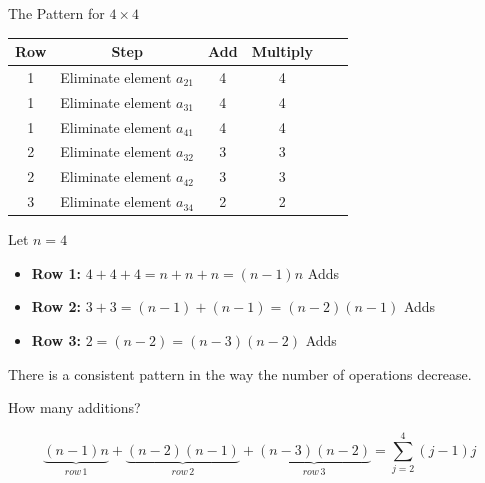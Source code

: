 \documentclass[10pt]{beamer}
\begin{document}
\begin{frame}{The Pattern for $4\times4$}
    \begin{center}
\begin{tabular}{c c c c c c}\hline
 Row & Step & Add & Multiply  \\\hline
 1 &  Eliminate element $a_{21}$ & 4 & 4\\
 1 &  Eliminate element $a_{31}$ & 4 & 4\\
 1 &  Eliminate element $a_{41}$ & 4 & 4\\
 2 &  Eliminate element $a_{32}$ & 3 & 3 \\
 2 &  Eliminate element $a_{42}$ & 3 & 3\\
 3 &  Eliminate element $a_{34}$ & 2 & 2 \\\hline
\end{tabular}
\end{center}
Let $n=4$
\begin{itemize}
    \item \textbf{Row 1:} $4+4+4=n+n+n=(n-1)n$ Adds 
    \item \textbf{Row 2:} $3+3=(n-1)+(n-1)=(n-2)(n-1)$ Adds
    \item \textbf{Row 3:} $2=(n-2)=(n-3)(n-2)$ Adds
\end{itemize}
\begin{alertblock}{}
    There is a consistent pattern in the way the number of operations decrease.
\end{alertblock}
\end{frame}
\begin{frame}{How many additions?}


$$
\underbrace{(n-1)n}_{row\,1} + \underbrace{(n-2)(n-1)}_{row\,2}+\underbrace{(n-3)(n-2)}_{row \,3}=\sum_{j=2}^4(j-1)j
$$


\end{frame}
\end{document}
